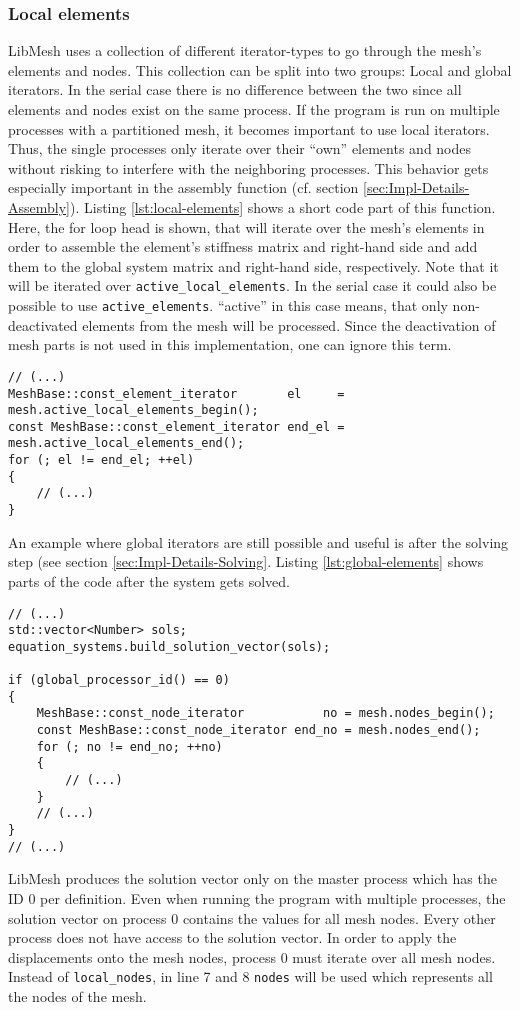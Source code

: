   
  \subsubsection{Local elements}\label{sec:Impl-Parallel-Local}
   LibMesh uses a collection of different iterator-types to go through the mesh's elements and nodes. This collection can be split into two groups: Local and global iterators. In the serial case there is no difference between the two since all elements and nodes exist on the same process. If the program is run on multiple processes with a partitioned mesh, it becomes important to use local iterators. Thus, the single processes only iterate over their ``own'' elements and nodes without risking to interfere with the neighboring processes. This behavior gets especially important in the assembly function (cf. section \ref{sec:Impl-Details-Assembly}). Listing \ref{lst:local-elements} shows a short code part of this function. Here, the for loop head is shown, that will iterate over the mesh's elements in order to assemble the element's stiffness matrix and right-hand side and add them to the global system matrix and right-hand side, respectively. Note that it will be iterated over \texttt{active\_local\_elements}. In the serial case it could also be possible to use \texttt{active\_elements}. ``active'' in this case means, that only non-deactivated elements from the mesh will be processed. Since the deactivation of mesh parts is not used in this implementation, one can ignore this term.
\begin{lstlisting}[caption=Local elements iterator,label=lst:local-elements,keepspaces=true]
// (...)
MeshBase::const_element_iterator       el     = mesh.active_local_elements_begin();
const MeshBase::const_element_iterator end_el = mesh.active_local_elements_end();
for (; el != end_el; ++el)
{
	// (...)
}
\end{lstlisting}
   An example where global iterators are still possible and useful is after the solving step (see section \ref{sec:Impl-Details-Solving}. Listing \ref{lst:global-elements} shows parts of the code after the system gets solved.
\begin{lstlisting}[caption=Global nodes iterator,label=lst:global-elements,keepspaces=true]
// (...)
std::vector<Number> sols;
equation_systems.build_solution_vector(sols);

if (global_processor_id() == 0)
{
	MeshBase::const_node_iterator           no = mesh.nodes_begin();
	const MeshBase::const_node_iterator end_no = mesh.nodes_end();
	for (; no != end_no; ++no)
	{
		// (...)
	}
	// (...)
}
// (...)
\end{lstlisting}
   LibMesh produces the solution vector only on the master process which has the ID $0$ per definition. Even when running the program with multiple processes, the solution vector on process 0 contains the values for all mesh nodes. Every other process does not have access to the solution vector. In order to apply the displacements onto the mesh nodes, process 0 must iterate over all mesh nodes. Instead of \texttt{local\_nodes}, in line 7 and 8 \texttt{nodes} will be used which represents all the nodes of the mesh.
  
